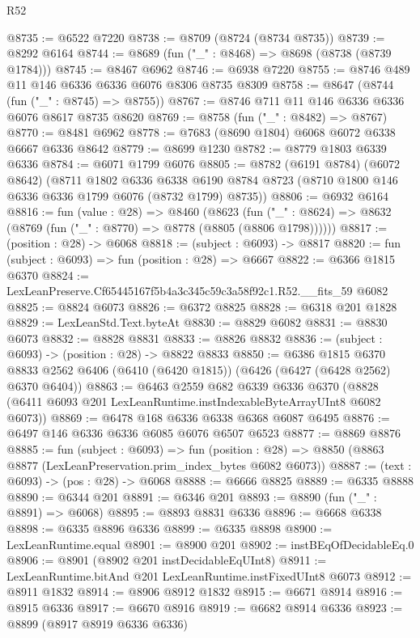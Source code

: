 \begin{lexlean}{R52}
\begin{coremodule}
@8735 := @6522 @7220
@8738 := @8709 (@8724 (@8734 @8735))
@8739 := @8292 @6164
@8744 := @8689 (fun ("_" : @8468) => @8698 (@8738 (@8739 @1784)))
@8745 := @8467 @6962
@8746 := @6938 @7220
@8755 := @8746 @489 @11 @146 @6336 @6336 @6076 @8306 @8735 @8309
@8758 := @8647 (@8744 (fun ("_" : @8745) => @8755))
@8767 := @8746 @711 @11 @146 @6336 @6336 @6076 @8617 @8735 @8620
@8769 := @8758 (fun ("_" : @8482) => @8767)
@8770 := @8481 @6962
@8778 := @7683 (@8690 @1804) @6068 @6072 @6338 @6667 @6336 @8642
@8779 := @8699 @1230
@8782 := @8779 @1803 @6339 @6336
@8784 := @6071 @1799 @6076
@8805 := @8782
    (@6191 @8784)
    (@6072 @8642)
    (@8711
      @1802
      @6336
      @6338
      @6190
      @8784
      @8723
      (@8710 @1800 @146 @6336 @6336 @1799 @6076 (@8732 @1799) @8735))
@8806 := @6932 @6164
@8816 := fun (value : @28) =>
  @8460
    (@8623 (fun ("_" : @8624) => @8632 (@8769 (fun ("_" : @8770) => @8778 (@8805 (@8806 @1798))))))
@8817 := (position : @28) -> @6068
@8818 := (subject : @6093) -> @8817
@8820 := fun (subject : @6093) => fun (position : @28) => @6667
@8822 := @6366 @1815 @6370
@8824 := LexLeanPreserve.Cf65445167f5b4a3c345c59c3a58f92c1.R52.__fits_59 @6082
@8825 := @8824 @6073
@8826 := @6372 @8825
@8828 := @6318 @201 @1828
@8829 := LexLeanStd.Text.byteAt
@8830 := @8829 @6082
@8831 := @8830 @6073
@8832 := @8828 @8831
@8833 := @8826 @8832
@8836 := (subject : @6093) -> (position : @28) -> @8822 @8833
@8850 := @6386
    @1815
    @6370
    @8833
    @2562
    @6406
    (@6410 (@6420 @1815))
    (@6426 (@6427 (@6428 @2562) @6370 @6404))
@8863 := @6463
    @2559
    @682
    @6339
    @6336
    @6370
    (@8828 (@6411 @6093 @201 LexLeanRuntime.instIndexableByteArrayUInt8 @6082 @6073))
@8869 := @6478 @168 @6336 @6338 @6368 @6087 @6495
@8876 := @6497 @146 @6336 @6336 @6085 @6076 @6507 @6523
@8877 := @8869 @8876
@8885 := fun (subject : @6093) =>
  fun (position : @28) => @8850 (@8863 @8877 (LexLeanPreservation.prim_index_bytes @6082 @6073))
@8887 := (text : @6093) -> (pos : @28) -> @6068
@8888 := @6666 @8825
@8889 := @6335 @8888
@8890 := @6344 @201
@8891 := @6346 @201
@8893 := @8890 (fun ("_" : @8891) => @6068)
@8895 := @8893 @8831 @6336
@8896 := @6668 @6338
@8898 := @6335 @8896 @6336
@8899 := @6335 @8898
@8900 := LexLeanRuntime.equal
@8901 := @8900 @201
@8902 := instBEqOfDecidableEq.{0}
@8906 := @8901 (@8902 @201 instDecidableEqUInt8)
@8911 := LexLeanRuntime.bitAnd @201 LexLeanRuntime.instFixedUInt8 @6073
@8912 := @8911 @1832
@8914 := @8906 @8912 @1832
@8915 := @6671 @8914
@8916 := @8915 @6336
@8917 := @6670 @8916
@8919 := @6682 @8914 @6336
@8923 := @8899 (@8917 @8919 @6336 @6336)

\end{coremodule}
\end{lexlean}
